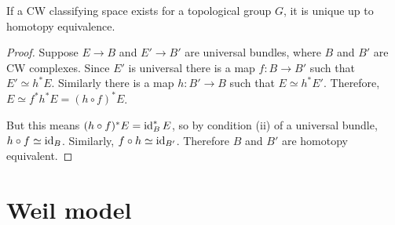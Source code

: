 \begin{comment}
Let $X$ be a CW complex, and $[X,B]$ be the homotopy classes of maps $h:X\to B$, 
and  $\mathcal{P}_G(X)$ be the isomorphism classes of principal $G$-bundles over $X$. 
Then the definition of universal $G$-bundle states the map
$\varphi:[X,BG]\to\mathcal{P}_G(X)$ given by $h\mapsto h^*(EG)$ is surjective
(condition (i)) and injective (condition (ii)). 
\end{comment}

\begin{thm} %
	If a CW classifying space exists for a topological group $G$, it is unique 
	up to homotopy equivalence.
\end{thm}
\begin{proof}
	Suppose $E\to B$ and  $E'\to B'$ are universal bundles, where $B$ and  $B'$
	are CW complexes. Since  $E'$ is
	universal there is a map  $f:B\to B'$ such that  $E'\simeq h^*E$. Similarly
	there is a map  $h:B'\to B$ such that  $E\simeq h^*E'$. Therefore,  $E\simeq
	f^*h^*E=(h\circ f)^*E$. 

	But this means  $(h\circ f)^*E = \operatorname{id}_B^*E$, so by condition (ii) of a
	universal bundle, $h\circ f \simeq \operatorname{id}_B$. Similarly, $f\circ h\simeq
	\operatorname{id}_{B'}$. Therefore $B$ and  $B'$ are homotopy equivalent.
\end{proof}



\section{Weil model}
